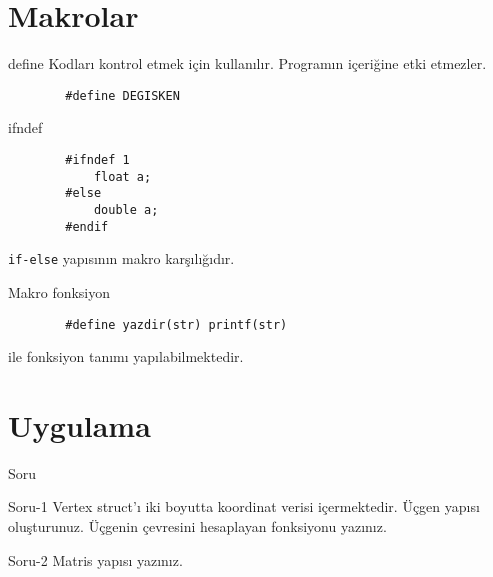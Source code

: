 \section{Makrolar}
\begin{frame}[fragile]{define}
    Kodları kontrol etmek için kullanılır. Programın içeriğine etki etmezler.
    \begin{lstlisting}
        #define DEGISKEN\end{lstlisting}
\end{frame}
\begin{frame}[fragile]{ifndef}
    \begin{lstlisting}
        #ifndef 1
            float a;
        #else
            double a;
        #endif\end{lstlisting}
    \lstinline{if-else} yapısının makro karşılığıdır.
\end{frame}
\begin{frame}[fragile]{Makro fonksiyon}
    \begin{lstlisting}
        #define yazdir(str) printf(str)\end{lstlisting}
    ile fonksiyon tanımı yapılabilmektedir.
\end{frame}
\section{Uygulama}
\begin{frame}[fragile]{Soru}
    \begin{alertblock}{Soru-1}
        Vertex struct'ı iki boyutta koordinat verisi içermektedir. Üçgen yapısı oluşturunuz. Üçgenin çevresini hesaplayan fonksiyonu yazınız.
    \end{alertblock}
    \begin{alertblock}{Soru-2}
        Matris yapısı yazınız.
    \end{alertblock}
\end{frame}
